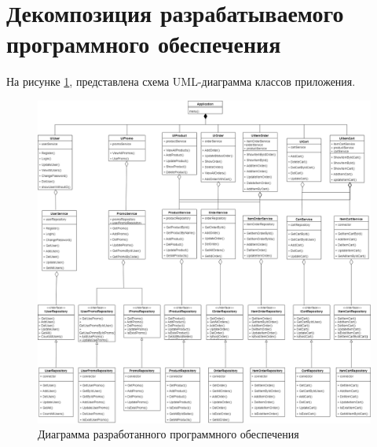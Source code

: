 \clearpage
\section{Декомпозиция разрабатываемого \newline программного обеспечения}
На рисунке \ref{img:uml_class}, представлена схема UML-диаграмма классов приложения.
\begin{figure}[ht!]
	\centering
	\includegraphics[height=1\linewidth]{img/UML_CLass.png}
	\caption{Диаграмма разработанного программного обеспечения}
	\label{img:uml_class}
\end{figure}

